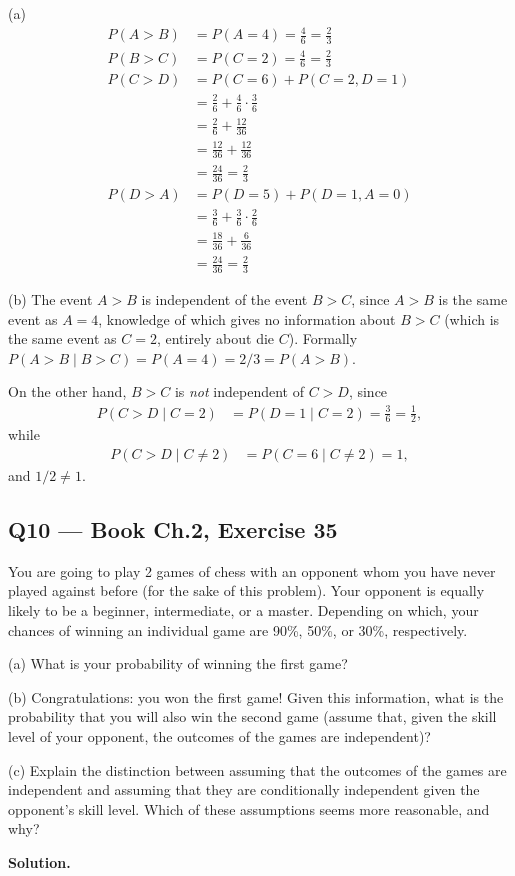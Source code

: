 \documentclass[11pt]{article}
\begin{document}
(a)
\begin{align*}
P(A>B) &= P(A=4) = \frac{4}{6} = \frac{2}{3} \\
P(B>C) &= P(C=2) = \frac{4}{6} = \frac{2}{3} \\
P(C>D) &= P(C=6) + P(C=2,D=1) \\
&= \frac{2}{6} + \frac{4}{6}\cdot\frac{3}{6} \\
&= \frac{2}{6} + \frac{12}{36} \\
&= \frac{12}{36} + \frac{12}{36} \\
&= \frac{24}{36} = \frac{2}{3} \\
P(D>A) &= P(D=5) + P(D=1,A=0) \\
&= \frac{3}{6} + \frac{3}{6}\cdot\frac{2}{6} \\
&= \frac{18}{36} + \frac{6}{36} \\
&= \frac{24}{36} = \frac{2}{3}
\end{align*}

(b) The event $A>B$ is independent of the event $B>C$, since $A>B$ is the same event as $A=4$, knowledge of which gives no information about $B>C$ (which is the same event as $C=2$, entirely about die $C$). Formally $P(A>B \mid B>C) = P(A=4) = 2/3 = P(A>B)$.

On the other hand, $B>C$ is \emph{not} independent of $C>D$, since
\begin{align*}
P(C>D \mid C=2) &= P(D=1 \mid C=2) = \frac{3}{6} = \frac{1}{2},
\end{align*}
while
\begin{align*}
P(C>D \mid C\neq 2) &= P(C=6\mid C\neq 2) = 1,
\end{align*}
and $1/2 \neq 1$.

\subsection*{Q10 --- Book Ch.2, Exercise 35}
\begin{qbox}
You are going to play 2 games of chess with an opponent whom you have never played against before (for the sake of this problem). Your opponent is equally likely to be a beginner, intermediate, or a master. Depending on which, your chances of winning an individual game are 90\%, 50\%, or 30\%, respectively.

(a) What is your probability of winning the first game?

(b) Congratulations: you won the first game! Given this information, what is the probability that you will also win the second game (assume that, given the skill level of your opponent, the outcomes of the games are independent)?

(c) Explain the distinction between assuming that the outcomes of the games are independent and assuming that they are conditionally independent given the opponent's skill level. Which of these assumptions seems more reasonable, and why?
\end{qbox}
\textbf{Solution.}
\end{document}
